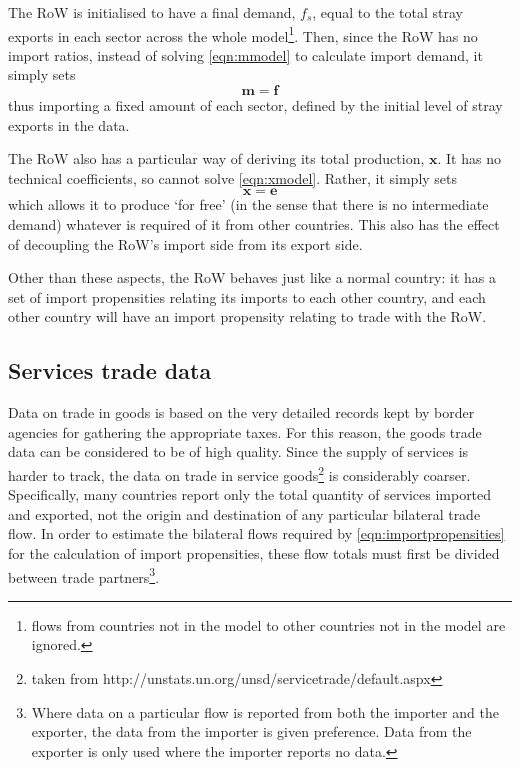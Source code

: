 \documentclass[a4paper]{article}
\begin{document}
The RoW is initialised to have a final demand, $f_s$, equal to the total stray exports in each sector across the whole model\footnote{flows from countries not in the model to other countries not in the model are ignored.}. Then, since the RoW has no import ratios, instead of solving \cref{eqn:mmodel} to calculate import demand, it simply sets
\begin{equation}\label{eqn:RoW_imports}
\boldsymbol{m} = \boldsymbol{f}
\end{equation}
thus importing a fixed amount of each sector, defined by the initial level of stray exports in the data.

The RoW also has a particular way of deriving its total production, $\boldsymbol{x}$. It has no technical coefficients, so cannot solve \cref{eqn:xmodel}. Rather, it simply sets
\begin{equation}\label{eqn:RoW_total_production}
\boldsymbol{x} = \boldsymbol{e}
\end{equation}
which allows it to produce `for free' (in the sense that there is no intermediate demand) whatever is required of it from other countries. This also has the effect of decoupling the RoW's import side from its export side.

Other than these aspects, the RoW behaves just like a normal country: it has a set of import propensities relating its imports to each other country, and each other country will have an import propensity relating to trade with the RoW.

\subsection{Services trade data}
Data on trade in goods is based on the very detailed records kept by border agencies for gathering the appropriate taxes.
For this reason, the goods trade data can be considered to be of high quality.
Since the supply of services is harder to track, the data on trade in service goods\footnote{taken from http://unstats.un.org/unsd/servicetrade/default.aspx} is considerably coarser.
Specifically, many countries report only the total quantity of services imported and exported, not the origin and destination of any particular bilateral trade flow.
In order to estimate the bilateral flows required by \cref{eqn:importpropensities} for the calculation of import propensities, these flow totals must first be divided between trade partners\footnote{Where data on a particular flow is reported from both the importer and the exporter, the data from the importer is given preference.
Data from the exporter is only used where the importer reports no data.}.
\end{document}
